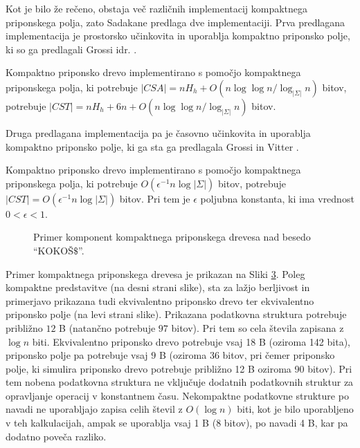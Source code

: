 Kot je bilo že rečeno, obstaja več različnih implementacij kompaktnega priponskega polja, zato Sadakane \cite{Sadakane2007} predlaga dve implementaciji. Prva predlagana implementacija je prostorsko učinkovita in uporablja kompaktno priponsko polje, ki so ga predlagali Grossi idr. \cite{Grossi2003}. 

\begin{posl}\label{pos:CSAnh}
Kompaktno priponsko drevo implementirano s pomočjo kompaktnega priponskega polja, ki potrebuje $|CSA|=nH_h+O(n\log\log{n} / \log_{| \Sigma|}{n})$ bitov, potrebuje $|CST|= nH_h+6n+O(n\log\log{n} / \log_{| \Sigma|}{n})$ bitov.    
\end{posl}

Druga predlagana implementacija pa je časovno učinkovita in uporablja kompaktno priponsko polje, ki ga sta ga predlagala Grossi in Vitter \cite{Grossi2000}. 
\begin{posl}\label{pos:CSAlog}
Kompaktno priponsko drevo implementirano s pomočjo kompaktnega priponskega polja, ki potrebuje $O(\epsilon^{-1}n\log{| \Sigma|})$ bitov, potrebuje $|CST|=O(\epsilon^{-1}n\log{| \Sigma|})$ bitov. Pri tem je $\epsilon$ poljubna konstanta, ki ima vrednost $0<\epsilon<1$.
\end{posl}

\begin{figure}[htb]       
        \begin{subfigure}[t]{1\linewidth}       
            
            \centering
            \subcaption*{}
            \label{fig:neKompaktnoDrevo}
        \end{subfigure}
        \begin{subfigure}[t]{1\linewidth}        
            
            \centering
            \subcaption*{}
            \label{fig:KompaktnoPolje}
        \end{subfigure}
    \caption{Primer komponent kompaktnega priponskega drevesa nad besedo \enquote{KOKOŠ$\$$}.} 
    \label{fig:CST}
\end{figure}

Primer kompaktnega priponskega drevesa je prikazan na Sliki \ref{fig:CST}. Poleg kompaktne predstavitve (na desni strani slike), sta za lažjo berljivost in primerjavo prikazana tudi ekvivalentno priponsko drevo ter ekvivalentno priponsko polje (na levi strani slike). Prikazana podatkovna struktura potrebuje približno $12$ B (natančno potrebuje $97$ bitov). Pri tem so cela števila zapisana z $\log{n}$ biti. Ekvivalentno priponsko drevo potrebuje vsaj 18 B (oziroma 142 bita), priponsko polje pa potrebuje vsaj $9$ B (oziroma 36 bitov, pri čemer priponsko polje, ki simulira priponsko drevo potrebuje približno 12 B oziroma 90 bitov). Pri tem nobena podatkovna struktura ne vključuje dodatnih podatkovnih struktur za opravljanje operacij v konstantnem času. Nekompaktne podatkovne strukture po navadi ne uporabljajo zapisa celih števil z $O(\log{n})$ biti, kot je bilo uporabljeno v teh kalkulacijah, ampak se uporablja vsaj 1 B (8 bitov), po navadi 4 B, kar pa dodatno poveča razliko.

